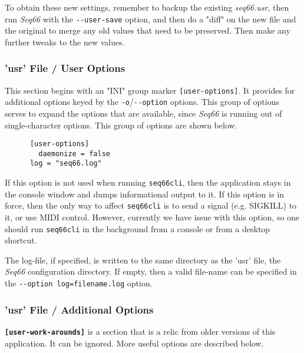    To obtain these new settings, remember to backup the existing
   \textsl{seq66.usr}, then run \textsl{Seq66} with the
   \texttt{-{}-user-save} option, and then do a "diff" on the new file and the
   original to merge any old values that need to be preserved.  Then make any
   further tweaks to the new values.

\subsubsection{'usr' File / User Options}
\label{subsubsec:usr_file_user_options}

   This section begins with an
   "INI" group marker \texttt{[user-options]}.
   It provides for additional options keyed by the
   \texttt{-o}/\texttt{-{}-option} options.
   This group of options serves to expand the options that are available, since
   \textsl{Seq66} is running out of single-character options.
   This group of options are shown below.

   \begin{verbatim}
      [user-options]
		daemonize = false
      log = "seq66.log"
   \end{verbatim}

   If this option is not used when running \texttt{seq66cli}, then the
   application stays in the console window and dumps informational output to
   it.  If this option is in force, then the only way to affect
   \texttt{seq66cli} is to send a signal (e.g. SIGKILL) to it, or use
   MIDI control.
   However, currently we have issue with this option, so one should run
   \texttt{seq66cli} in the background from a console or from a desktop shortcut.

   The log-file, if specified, is written to the same directory as the 'usr'
   file, the \textsl{Seq66} configuration directory.
   If empty, then a valid file-name can be specified
   in the \texttt{-{}-option log=filename.log} option.

\subsubsection{'usr' File / Additional Options}
\label{subsubsec:usr_file_added_options}

   \textbf{\texttt{[user-work-arounds]}} is a section that is a relic from
   older versions of this application.  It can be ignored.  More useful options
   are described below.

